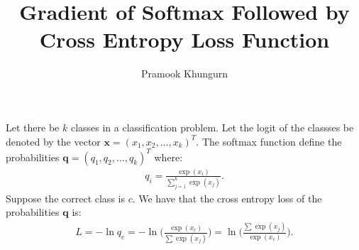 \documentclass[10pt]{article}
\title{Gradient of Softmax Followed by Cross Entropy Loss Function}
\author{Pramook Khungurn}
\newcommand{\ve}[1]{\mathbf{#1}}
\begin{document}
  \maketitle

  Let there be $k$ classes in a classification problem. Let the logit of the classses be denoted by the vector $\ve{x} = (x_1, x_2, \dotsc, x_k)^T$. The softmax function define the probabilities $\ve{q} = (q_1, q_2, \dotsc, q_k)^T$ where:
  \begin{align*}
  	q_i = \frac{\exp(x_i)}{\sum_{j=1}^k \exp(x_j)}.
  \end{align*}
  Suppose the correct class is $c$. We have that the cross entropy loss of the probabilities $\ve{q}$ is:
  \begin{align*}
  	L 
  	= -\ln q_c 
  	= -\ln \bigg( \frac{\exp(x_c)}{\sum \exp(x_j)} \bigg)
  	= \ln \bigg( \frac{\sum \exp(x_j)}{\exp(x_c)} \bigg).
  \end{align*}
\end{document}
